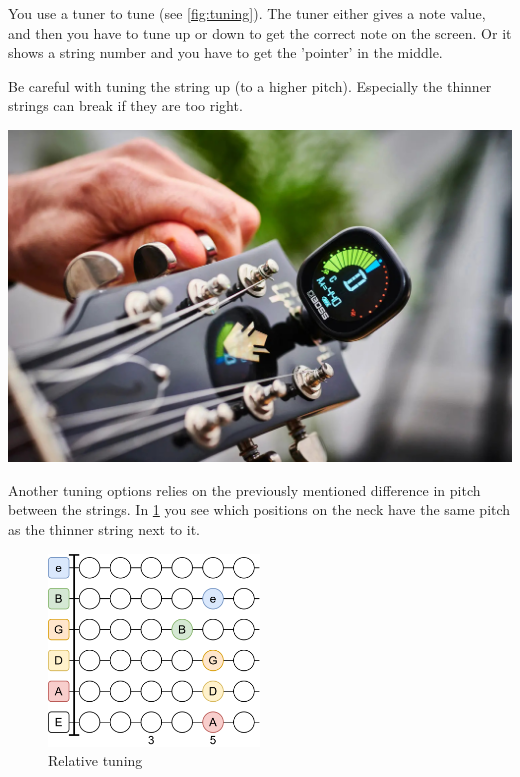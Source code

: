 \begin{minipage}{0.5\textwidth}
You use a tuner to tune (see \ref{fig:tuning}). The tuner either gives a note value, and then you have to tune up or down to get the correct note on the screen. Or it shows a string number and you have to get the 'pointer' in the middle.

Be careful with tuning the string up (to a higher pitch). Especially the thinner strings can break if they are too right.
\end{minipage}
\hfill
\begin{minipage}{0.34\textwidth}
    \centering
    \includegraphics[width=\textwidth]{../Images/guitar-tuning.jpg}
    \label{fig:tuning}
\end{minipage}

Another tuning options relies on the previously mentioned difference in pitch between the strings. In \ref{fig:guitar_relative_tuning} you see which positions on the neck have the same pitch as the thinner string next to it.

\begin{figure}[h]
    \centering
    \includegraphics[width=0.5\textwidth]{../Images/GuitarRelativeTuning.png}
    \caption{Relative tuning}
    \label{fig:guitar_relative_tuning}
\end{figure}
